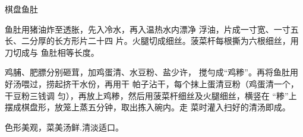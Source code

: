\begin{recipe}{棋盘鱼肚}

\ingredients


\cooking

\step 鱼肚用猪油炸至透胀，先入冷水，再入温热水内漂净 浮油，片成一寸宽、一寸五长、二分厚的长方形片二十四 片。火腿切成细丝。菠菜杆每根撕为六根细丝，用刀切成与 鱼肚相等长度。

鸡脯、肥膘分别砸茸，加鸡蛋清、水豆粉、盐少许， 搅勻成“鸡糁”。再将鱼肚用好汤喂过，捞起挤干水份，再用干 帕子沾干，每个抹上蛋清豆粉（鸡蛋清一个，干豆粉三钱调 匀），再放上鸡糁，然后用菠菜杆细丝及火腿细丝，横竖在 “糁”上摆成棋盘形，放笼上蒸五分钟，取出拣入碗内。走 菜时灌入扫好的清汤即成。

\notes

色形美观，菜美汤鲜.清淡适口。

\end{recipe}

